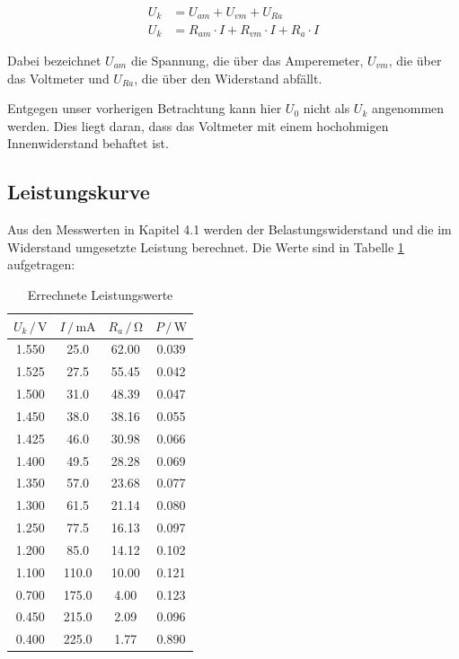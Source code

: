 \begin{align}
U_k &= U_{am} + U_{vm} + U_{Ra}\\
U_k &= R_{am}\cdot I + R_{vm}\cdot I + R_a\cdot I  
\end{align}

Dabei bezeichnet $U_{am}$ die Spannung, die über das Amperemeter,
$U_{vm}$, die über das Voltmeter und $U_{Ra}$, die über den Widerstand
abfällt.

Entgegen unser vorherigen Betrachtung kann hier $U_0$ nicht als $U_k$
angenommen werden. Dies liegt daran, dass das Voltmeter mit einem 
hochohmigen Innenwiderstand behaftet ist.

\subsection{Leistungskurve}

Aus den Messwerten in Kapitel 4.1 werden der Belastungswiderstand und 
die im Widerstand umgesetzte Leistung berechnet. Die Werte sind in 
Tabelle \ref{tab:Leistung} aufgetragen:

\begin{table}
   \centering
   \caption{Errechnete Leistungswerte}
   \label{tab:Leistung}
   \begin{tabular}{c c c c}
     \toprule
      $U_k \,/\, \si{\volt}$ & $I \,/\, \si{\milli\ampere}$ & $R_a \,/\, \si{\ohm}$ & $P \,/\, \si{\watt}$\\
     \midrule
      1.550 &  25.0 & 62.00 & 0.039\\
      1.525 &  27.5 & 55.45 & 0.042\\
      1.500 &  31.0 & 48.39 & 0.047\\
      1.450 &  38.0 & 38.16 & 0.055\\
      1.425 &  46.0 & 30.98 & 0.066\\
      1.400 &  49.5 & 28.28 & 0.069\\
      1.350 &  57.0 & 23.68 & 0.077\\
      1.300 &  61.5 & 21.14 & 0.080\\
      1.250 &  77.5 & 16.13 & 0.097\\
      1.200 &  85.0 & 14.12 & 0.102\\
      1.100 & 110.0 & 10.00 & 0.121\\
      0.700 & 175.0 &  4.00 & 0.123\\
      0.450 & 215.0 &  2.09 & 0.096\\
      0.400 & 225.0 &  1.77 & 0.890\\
     \bottomrule
   \end{tabular}
 \end{table}

